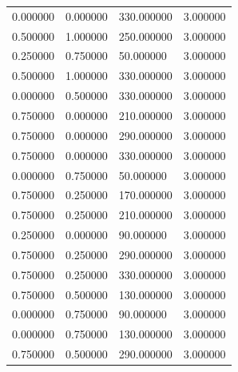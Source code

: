 \documentclass[12pt]{report}
\begin{document}
\begin{center}
\begin{table}[h!]
\begin{center}
\begin{tabular}{|llll|}
				0.000000                      & 0.000000                   & 330.000000                & 3.000000 \\
				0.500000                      & 1.000000                   & 250.000000                & 3.000000 \\
				0.250000                      & 0.750000                   & 50.000000                 & 3.000000 \\
				0.500000                      & 1.000000                   & 330.000000                & 3.000000 \\
				0.000000                      & 0.500000                   & 330.000000                & 3.000000 \\
				0.750000                      & 0.000000                   & 210.000000                & 3.000000 \\
				0.750000                      & 0.000000                   & 290.000000                & 3.000000 \\
				0.750000                      & 0.000000                   & 330.000000                & 3.000000 \\
				0.000000                      & 0.750000                   & 50.000000                 & 3.000000 \\
				0.750000                      & 0.250000                   & 170.000000                & 3.000000 \\
				0.750000                      & 0.250000                   & 210.000000                & 3.000000 \\
				0.250000                      & 0.000000                   & 90.000000                 & 3.000000 \\
				0.750000                      & 0.250000                   & 290.000000                & 3.000000 \\
				0.750000                      & 0.250000                   & 330.000000                & 3.000000 \\
				0.750000                      & 0.500000                   & 130.000000                & 3.000000 \\
				0.000000                      & 0.750000                   & 90.000000                 & 3.000000 \\
				0.000000                      & 0.750000                   & 130.000000                & 3.000000 \\
				0.750000                      & 0.500000                   & 290.000000                & 3.000000 \\

\end{tabular}
\end{center}
\end{table}
\end{center}
\end{document}
